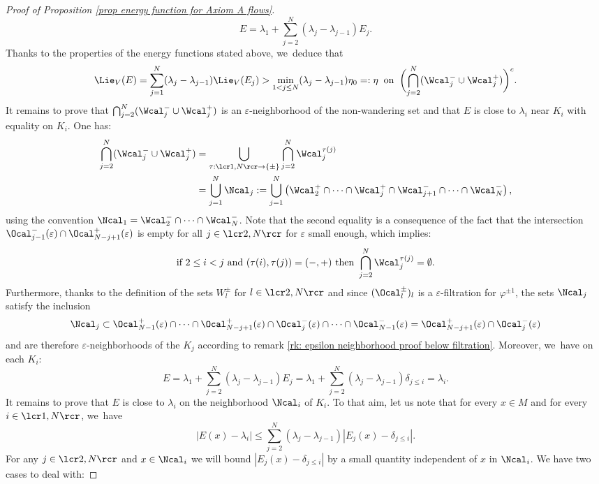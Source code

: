 \begin{proof}[Proof of Proposition \ref{prop energy function for Axiom A flows}]
\[
E = \lambda_1 + \sum_{j = 2}^N (\lambda_{j} - \lambda_{j-1}) E_{j}.
\]
Thanks to the properties of the energy functions stated above, we~deduce that
\[
\Lie_V (E) = \sum_{j = 1}^N (\lambda_j - \lambda_{j-1}) \Lie_V (E_j) > \min_{1 < j \leq N}(\lambda_j - \lambda_{j-1}) \eta_0 =: \eta \: \text{ on } \: \biggl(\bigcap_{j =2}^N (\Wcal_j^- \cup \Wcal_j^+) \biggr)^c.
\]
It remains to prove that $\bigcap_{j = 2}^N (\Wcal_j^- \cup \Wcal_j^+)$ is an $\varepsilon$-neighborhood of the non-wandering set and that $E$ is close to $\lambda_i$ near $K_i$ with equality on $K_i$. One has:
\begin{align*}
\bigcap_{j = 2}^N (\Wcal_j^- \cup \Wcal_j^+) &= \bigcup_{\tau: \lcr1,N\rcr \to \{\pm\}} \bigcap_{j = 2}^N \Wcal_j^{\tau (j)} \\
&= \bigcup_{j = 1}^N \Ncal_j:= \bigcup_{j = 1}^N \left(\Wcal_{2}^+ \cap \cdots \cap \Wcal_{j}^+ \cap \Wcal_{j+1}^- \cap \cdots \cap \Wcal_{N}^- \right),
\end{align*}
using the convention $\Ncal_1 = \Wcal_{2}^- \cap \cdots \cap \Wcal_{N}^-$.
Note that the second equality is a consequence of the fact that the intersection $\Ocal_{j-1}^- (\varepsilon) \cap \Ocal_{N-j+1}^+ (\varepsilon)$ is empty for all $j\in\lcr2,N\rcr$ for $\varepsilon $ small enough, which implies:
\[
\text{if } 2 \leq i < j \text{ and } (\tau (i), \tau (j)) = (-,+) \text{ then } \bigcap_{j = 2}^N \Wcal_j^{\tau (j)} = \emptyset.
\]
\Changel
\noindent
Furthermore, thanks to the definition of the sets $W_l^{\pm}$ for $l\in\lcr2,N\rcr$ and since $(\Ocal_l^{\pm})_l$ is a $\varepsilon$-filtration for $\varphi^{\pm 1}$, the sets $\Ncal_j$ satisfy the inclusion
\[
\Ncal_j \subset \Ocal_{N-1}^+ (\varepsilon) \cap \cdots \cap \Ocal_{N-j+1}^+ (\varepsilon) \cap \Ocal_{j}^- (\varepsilon) \cap \cdots \cap \Ocal_{N-1}^- (\varepsilon) = \Ocal_{N-j+1}^+ (\varepsilon) \cap \Ocal_{j}^- (\varepsilon)
\]
and are therefore $\varepsilon$-neighborhoods of the $K_j$ according to remark \ref{rk: epsilon neighborhood proof below filtration}.
Moreover, we~have on each $K_i$:
\[
E = \lambda_1 + \sum_{j = 2}^N (\lambda_j - \lambda_{j-1}) E_j = \lambda_1 + \sum_{j = 2}^N (\lambda_j - \lambda_{j-1}) \delta_{j \leq i} = \lambda_i.
\]
\Changelback
\noindent
It remains to prove that $E$ is close to $\lambda_i$ on the neighborhood $\Ncal_i$ of $K_i$. To that aim, let us note that for every $x \in M$ and for every $i\in\lcr1,N\rcr$, we~have
\[
|E(x) - \lambda_i | \leq \sum_{j = 2}^N (\lambda_j - \lambda_{j-1}) |E_j (x) - \delta_{j \leq i} |.
\]
For any $j\in\lcr2,N\rcr$ and $x \in \Ncal_i$ we will bound $|E_j (x) - \delta_{j \leq i}|$ by a small quantity independent of $x$ in $\Ncal_i$. We have two cases to deal with:

\end{proof}
